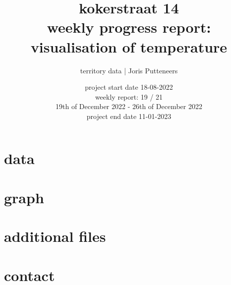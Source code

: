 \documentclass{article}
\author{territory data | Joris Putteneers}
\title{kokerstraat 14\\ \large weekly progress report: visualisation of temperature}\date{project start date 18-08-2022 \\weekly report: 19 /   21 \\ 19th of December 2022 - 26th of December 2022 \\project end date 11-01-2023 }
\begin{document}
  
\maketitle  
\tableofcontents 
\newpage 
\section{data} 
 
\section{graph} 
 
\section{additional files} 
 
\section{contact} 
 
\end{document}
